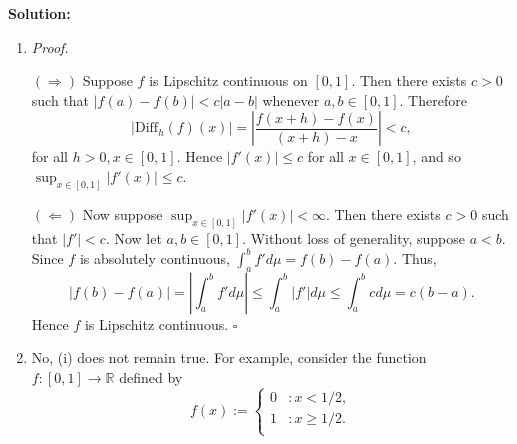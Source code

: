\documentclass[12pt]{article}
\newcounter{ProofCounter}
\newenvironment{Proof}{\stepcounter{ProofCounter}\textit{Proof.}}{\hfill$\square$}
\begin{document}
{\bf Solution:}
\begin{enumerate}[label=(\roman*)]
\item 
\begin{Proof}

$(\Rightarrow)$ Suppose $f$ is Lipschitz continuous on $[0,1]$. Then there exists $c > 0$ such that $|f(a) - f(b)| < c|a - b|$ whenever $a,b \in
[0,1]$. Therefore 
\[ |\text{Diff}_{h}(f)(x)| = \left| \frac{f(x + h) - f(x)}{(x + h) - x}\right| < c, \]
for all $h > 0, x \in [0,1]$. Hence $|f'(x)| \leq c$ for all $x \in [0,1]$, and so $\sup_{x \in [0,1]}|f'(x)| \leq c$.

$(\Leftarrow)$ Now suppose $\sup_{x \in [0,1]}|f'(x)| < \infty$. Then there exists $c > 0$ such that $|f'| < c$. Now let $a,b \in [0,1]$. Without loss
of generality, suppose $a < b$. Since $f$ is absolutely continuous, $\int_{a}^{b}f'd\mu = f(b) - f(a)$. Thus,
\[ |f(b) - f(a)| = \left| \int_{a}^{b}f'd\mu \right| \leq \int_{a}^{b}|f'|d\mu \leq \int_{a}^{b}cd\mu = c(b - a). \]
Hence $f$ is Lipschitz continuous.
\end{Proof}

\item No, (i) does not remain true. For example, consider the function $f : [0,1] \rightarrow \mathbb{R}$ defined by
\[ f(x) := \left\{ \begin{array}{cl}
0 & : x < 1/2, \\
1 & : x \geq 1/2. \\ 
\end{array} \right. \]
\end{enumerate}
\end{document}
